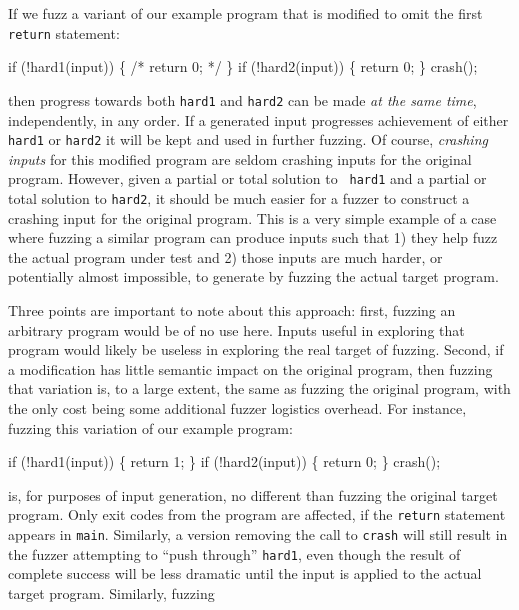 If we fuzz a variant of our example program that is modified to omit the first {\tt return} statement:

\begin{code}
  if (!hard1(input)) \{
    /* return 0; */
  \}
  if (!hard2(input)) \{
      return 0;
  \}
  crash();   
\end{code}

\noindent then progress towards both {\tt hard1} and {\tt hard2} can
be made \emph{at the same time}, independently, in any order.  If a generated input progresses
achievement of either {\tt hard1} or {\tt hard2} it will be kept and
used in further fuzzing.   Of course, \emph{crashing inputs} for this
modified program are seldom crashing inputs for the
original program.  However, given a partial or total solution to {\tt
  hard1} and a partial or total solution to {\tt hard2}, it should be
much easier for a fuzzer to construct a crashing input for the
original program.  This is a very simple example of a case where
fuzzing a similar program can produce inputs such that 1) they help fuzz the
actual program under test and 2) those inputs are much harder, or
potentially almost impossible, to
generate by fuzzing the actual target program.

Three points are important to note about this approach: first, fuzzing
an arbitrary program would be of no use here.  Inputs useful in
exploring that program would likely be useless in exploring the real
target of fuzzing.  Second, if a modification has little semantic
impact on the original program, then fuzzing that variation is, to a
large extent, the same as fuzzing the original program, with the only
cost being some additional fuzzer logistics overhead.  For instance,
fuzzing this variation of our example program:

\begin{code}
  if (!hard1(input)) \{
      return 1;
  \}
  if (!hard2(input)) \{
      return 0;
  \}
  crash();   
\end{code}

\noindent is, for purposes of input generation, no different than
fuzzing the original target program.  Only exit codes from the program
are affected, if the {\tt return} statement appears in {\tt main}.
Similarly, a version removing the call to {\tt crash{}} will still result in the
fuzzer attempting to ``push through'' {\tt hard1}, even though the
result of complete success will be less dramatic until the input is
applied to the actual target program.  Similarly, fuzzing

